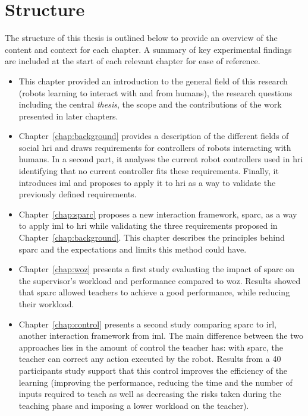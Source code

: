 \section{Structure}\label{sec:intro_struct}
The structure of this thesis is outlined below to provide an overview of the content and context for each chapter. A summary of key experimental findings are included at the start of each relevant chapter for ease of reference. 

\begin{itemize}
	\item This chapter provided an introduction to the general field of this research (robots learning to interact with and from humans), the research questions including the central \emph{thesis}, the scope and the contributions of the work presented in later chapters.  

	\item Chapter~\ref{chap:background} provides a description of the different fields of social \gls{hri} and draws requirements for controllers of robots interacting with humans. In a second part, it analyses the current robot controllers used in \gls{hri} identifying that no current controller fits these requirements. Finally, it introduces \gls{iml} and proposes to apply it to \gls{hri} as a way to validate the previously defined requirements.
	
	\item Chapter~\ref{chap:sparc} proposes a new interaction framework, \gls{sparc}, as a way to apply \gls{iml} to \gls{hri} while validating the three requirements proposed in Chapter~\ref{chap:background}. This chapter describes the principles behind \gls{sparc} and the expectations and limits this method could have.
	
	\item Chapter~\ref{chap:woz} presents a first study evaluating the impact of \gls{sparc} on the supervisor's workload and performance compared to \gls{woz}. Results showed that \gls{sparc} allowed teachers to achieve a good performance, while reducing their workload.
	
	\item Chapter~\ref{chap:control} presents a second study comparing \gls{sparc} to \gls{irl}, another interaction framework from \gls{iml}. The main difference between the two approaches lies in the amount of control the teacher has: with \gls{sparc}, the teacher can correct any action executed by the robot. Results from a 40 participants study support that this control improves the efficiency of the learning (improving the performance, reducing the time and the number of inputs required to teach as well as decreasing the risks taken during the teaching phase and imposing a lower workload on the teacher).
	

\end{itemize}
